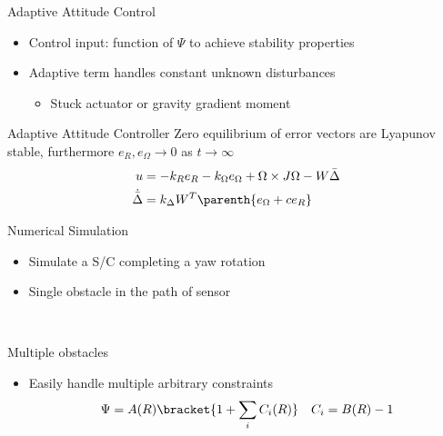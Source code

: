 \documentclass[11pt,professionalfonts]{beamer}
\begin{document}
\begin{frame}{Adaptive Attitude Control} %
\begin{itemize}
	\item Control input: function of \( \Psi \) to achieve stability properties
	\item Adaptive term handles constant unknown disturbances 
		\begin{itemize}
			\item Stuck actuator or gravity gradient moment
		\end{itemize}
\end{itemize}
\pause
	\begin{block}{Adaptive Attitude Controller}
		Zero equilibrium of error vectors are Lyapunov stable, furthermore \( e_R , e_\Omega \to 0 \) as \( t \to \infty \)
		\begin{align*}
			u &= - k_R e_R - k_{\Omega} e_{\Omega} + \Omega \times J \Omega - W \bar{\Delta} \\
			\dot{\bar{\Delta}} &= k_\Delta W^T \parenth{ e_\Omega + c e_R }
		\end{align*}
	\end{block}
	
\end{frame}   %

\begin{frame}{Numerical Simulation} %

\begin{itemize}
	\item Simulate a S/C completing a yaw rotation
	\item Single obstacle in the path of sensor
\end{itemize}

~
\end{frame}%

\begin{frame}{Multiple obstacles}%

\begin{itemize}
	\item Easily handle multiple arbitrary constraints 
	\begin{align*}
		\Psi = A(R) \bracket{1 + \sum_i C_i(R)} \quad C_i = B(R) - 1
	\end{align*}
\end{itemize}
\begin{figure}
	\centering
\end{figure}

\end{frame}%
\end{document}
